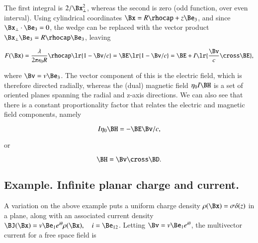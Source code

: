 The first integral is \( 2/\Bx_\perp^2 \), whereas the second is zero (odd function, over even interval).
Using cylindrical coordinates \( \Bx = R \rhocap + z \Be_3 \), and since
\( \Bx_\perp \cdot \Be_3 = 0 \), the wedge can be replaced with the vector product \( \Bx_\perp \Be_3 = R \rhocap \Be_3 \), leaving

\begin{equation}\label{eqn:statics:180}
F(\Bx)
=
\frac{\lambda}{2\pi \epsilon_0 R} \rhocap \lr{ 1 - \Bv/c} = \BE \lr{ 1 - \Bv/c }
= \BE + I \lr{ \frac{\Bv}{c} \cross \BE },
\end{equation}

where \( \Bv = v \Be_3 \).
The vector component of this is the electric field, which is therefore directed radially, whereas the (dual) magnetic field \( \eta_0 I \BH \)
is a set of oriented planes spanning the radial and z-axis directions.
We can also see that there is a constant proportionality factor that relates the electric and magnetic field components, namely

\begin{dmath}\label{eqn:statics:200}
I \eta_0 \BH = -\BE \Bv/c,
\end{dmath}

or

\begin{dmath}\label{eqn:statics:220}
\BH = \Bv \cross \BD.
\end{dmath}


\subsection{Example.  Infinite planar charge and current.}

A variation on the above example puts a uniform charge density \( \rho(\Bx) = \sigma \delta(z) \) in a plane, along with an associated current density \( \BJ(\Bx) = v \Be_1 e^{i\theta} \rho(\Bx), \quad i = \Be_{12} \).  Letting \( \Bv = v \Be_1 e^{i\theta} \), the multivector current for a free space field is

